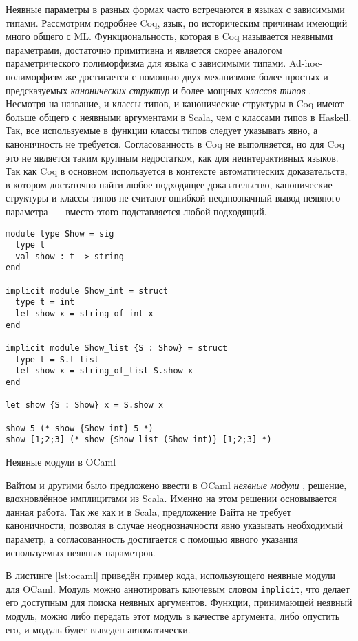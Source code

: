 \documentclass[../diploma.tex]{subfiles}
\begin{document}
Неявные параметры в разных формах часто встречаются в языках с зависимыми типами. Рассмотрим подробнее Coq, язык, по историческим причинам имеющий много общего с ML. Функциональность, которая в Coq называется неявными параметрами, достаточно примитивна и является скорее аналогом параметрического полиморфизма для языка с зависимыми типами. Ad-hoc-полиморфизм же достигается с помощью двух механизмов: более простых и предсказуемых \textit{канонических структур} \cite{canonical_structures} и более мощных \textit{классов типов} \cite{coq_typeclasses}. Несмотря на название, и классы типов, и канонические структуры в Coq имеют больше общего с неявными аргументами в Scala, чем с классами типов в Haskell. Так, все используемые в функции классы типов следует указывать явно, а каноничность не требуется. Согласованность в Coq не выполняется, но для Coq это не является таким крупным недостатком, как для неинтерактивных языков. Так как Coq в основном используется в контексте автоматических доказательств, в котором достаточно найти любое подходящее доказательство, канонические структуры и классы типов не считают ошибкой неоднозначный вывод неявного параметра~--- вместо этого подставляется любой подходящий.

\begin{listing}[H]
\begin{verbatim}
module type Show = sig
  type t
  val show : t -> string
end

implicit module Show_int = struct
  type t = int
  let show x = string_of_int x
end

implicit module Show_list {S : Show} = struct
  type t = S.t list
  let show x = string_of_list S.show x
end

let show {S : Show} x = S.show x

show 5 (* show {Show_int} 5 *)
show [1;2;3] (* show {Show_list (Show_int)} [1;2;3] *)
\end{verbatim}
\caption{Неявные модули в OCaml}
\label{lst:ocaml}
\end{listing}

Вайтом и другими было предложено ввести в OCaml \textit{неявные модули} \cite{white}, решение, вдохновлённое имплицитами из Scala. Именно на этом решении основывается данная работа. Так же как и в Scala, предложение Вайта  не требует каноничности, позволяя в случае неоднозначности явно указывать необходимый параметр, а согласованность достигается с помощью явного указания используемых неявных параметров.

В листинге \ref{lst:ocaml} приведён пример кода, использующего неявные модули для OCaml. Модуль можно аннотировать ключевым словом \texttt{implicit}, что делает его доступным для поиска неявных аргументов. Функции, принимающей неявный модуль, можно либо передать этот модуль в качестве аргумента, либо опустить его, и модуль будет выведен автоматически. 
\end{document}
